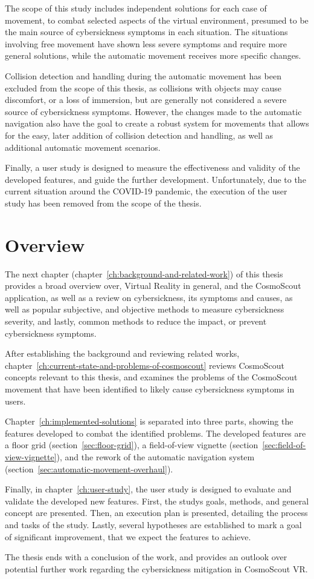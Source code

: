 The scope of this study includes independent solutions for each case of movement, to combat selected
aspects of the virtual environment, presumed to be the main source of cybersickness symptoms in each situation.
The situations involving free movement have shown less severe symptoms and require more general solutions, while the
automatic movement receives more specific changes.

Collision detection and handling during the automatic movement has been excluded from the scope of this thesis, as
collisions with objects may cause discomfort, or a loss of immersion, but are generally not considered a severe source
of cybersickness symptoms.
However, the changes made to the automatic navigation also have the goal to create a robust system for movements that
allows for the easy, later addition of collision detection and handling, as well as additional automatic movement
scenarios.

Finally, a user study is designed to measure the effectiveness and validity of the developed features, and guide the
further development.
Unfortunately, due to the current situation around the COVID-19 pandemic, the execution of the user study has been
removed from the scope of the thesis.


\section{Overview}\label{sec:overview}

The next chapter (chapter~\ref{ch:background-and-related-work}) of this thesis provides a broad overview over,
Virtual Reality in general, and the CosmoScout application, as well as a review on cybersickness, its symptoms and
causes, as well as popular subjective, and objective methods to measure cybersickness severity, and lastly, common
methods to reduce the impact, or prevent cybersickness symptoms.

After establishing the background and reviewing related works,
chapter~\ref{ch:current-state-and-problems-of-cosmoscout} reviews CosmoScout concepts relevant to this thesis, and
examines the problems of the CosmoScout movement that have been identified to likely cause cybersickness symptoms in
users.

Chapter~\ref{ch:implemented-solutions} is separated into three parts, showing the features developed to combat
the identified problems.
The developed features are a floor grid (section~\ref{sec:floor-grid}), a field-of-view vignette
(section~\ref{sec:field-of-view-vignette}), and the rework of the automatic navigation system
(section~\ref{sec:automatic-movement-overhaul}).

Finally, in chapter~\ref{ch:user-study}, the user study is designed to evaluate and validate the developed new features.
First, the studys goals, methods, and general concept are presented.
Then, an execution plan is presented, detailing the process and tasks of the study.
Lastly, several hypotheses are established to mark a goal of significant improvement, that we expect the features to
achieve.

The thesis ends with a conclusion of the work, and provides an outlook over potential further work regarding the
cybersickness mitigation in CosmoScout VR\@.
